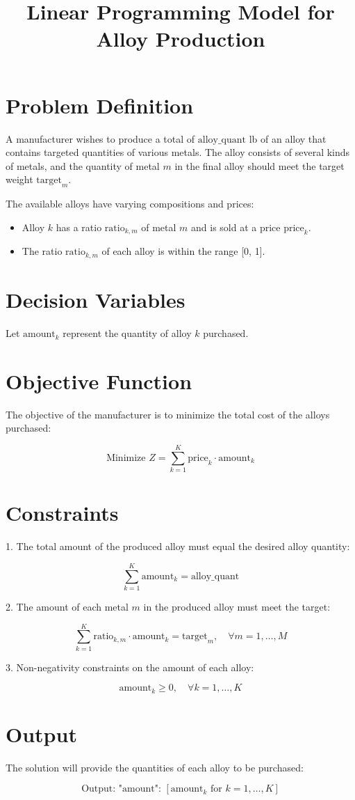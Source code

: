 \documentclass{article}
\begin{document}
\title{Linear Programming Model for Alloy Production}
\author{}
\date{}
\maketitle

\section*{Problem Definition}
A manufacturer wishes to produce a total of \( \text{alloy\_quant} \) lb of an alloy that contains targeted quantities of various metals. The alloy consists of several kinds of metals, and the quantity of metal \( m \) in the final alloy should meet the target weight \( \text{target}_{m} \). 

The available alloys have varying compositions and prices:

\begin{itemize}
    \item Alloy \( k \) has a ratio \( \text{ratio}_{k,m} \) of metal \( m \) and is sold at a price \( \text{price}_k \).
    \item The ratio \( \text{ratio}_{k,m} \) of each alloy is within the range [0, 1].
\end{itemize}

\section*{Decision Variables}
Let \( \text{amount}_k \) represent the quantity of alloy \( k \) purchased.

\section*{Objective Function}
The objective of the manufacturer is to minimize the total cost of the alloys purchased:

\[
\text{Minimize } Z = \sum_{k=1}^{K} \text{price}_k \cdot \text{amount}_k
\]

\section*{Constraints}
1. The total amount of the produced alloy must equal the desired alloy quantity:

\[
\sum_{k=1}^{K} \text{amount}_k = \text{alloy\_quant}
\]

2. The amount of each metal \( m \) in the produced alloy must meet the target:

\[
\sum_{k=1}^{K} \text{ratio}_{k,m} \cdot \text{amount}_k = \text{target}_{m}, \quad \forall m = 1, \ldots, M
\]

3. Non-negativity constraints on the amount of each alloy:

\[
\text{amount}_k \geq 0, \quad \forall k = 1, \ldots, K
\]

\section*{Output}
The solution will provide the quantities of each alloy to be purchased:

\[
\text{Output: } \text{"amount": } [ \text{amount}_k \text{ for } k = 1, \ldots, K ]
\]
\end{document}
